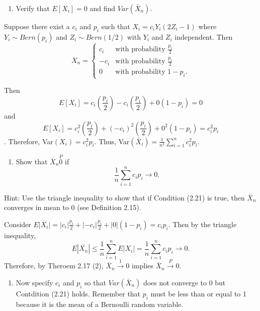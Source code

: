 \documentclass[12pt,]{article}
\providecommand{\tightlist}{%
  \setlength{\itemsep}{0pt}\setlength{\parskip}{0pt}}
\begin{document}
\begin{enumerate}
\def\labelenumi{(\alph{enumi})}
\tightlist
\item
  Verify that \(E[X_i] = 0\) and find \(Var(\bar{X}_n).\)
\end{enumerate}

Suppose there exist a \(c_i\) and \(p_i\) such that
\(X_i = c_iY_i(2Z_i-1)\) where \(Y_i\sim Bern(p_i)\) and
\(Z_i\sim Bern(1/2)\) with \(Y_i\) and \(Z_i\) independent. Then
\[X_n = \begin{cases}
                                   c_i & \text{with probability $\frac{p_i}{2}$} \\
                                   -c_i & \text{with probability $\frac{p_i}{2}$} \\
                                   0 & \text{with probability $1-p_i$}.
  \end{cases}\]

Then
\[E[X_i]=c_i\left(\frac{p_i}{2}\right)-c_i\left(\frac{p_i}{2}\right)+0(1-p_i)=0\]
and
\[E[X_i]=c_i^2\left(\frac{p_i}{2}\right)+(-c_i)^2\left(\frac{p_i}{2}\right)+0^2(1-p_i)=c_i^2p_i\].
Therefore, Var\((X_i) = c_i^2p_i.\) Thus,
Var\((\bar{X}_i)=\frac{1}{n^2}\sum_{i=1}^n c_i^2p_i\).

\begin{enumerate}
\def\labelenumi{(\alph{enumi})}
\setcounter{enumi}{1}
\tightlist
\item
  Show that \(\bar{X}_n \overset{P} 0\) if
  \[\frac{1}{n}\sum_{i=1}^n c_ip_i\rightarrow 0.\]
\end{enumerate}

Hint: Use the triangle inequality to show that if Condition (2.21) is
true, then \(\bar{X}_n\) converges in mean to 0 (see Definition 2.15).

Consider
\(E|X_i|=|c_i|\frac{p_i}{2}+|-c_i|\frac{p_i}{2}+|0|(1-p_i)=c_ip_i.\)
Then by the triangle inequality,
\[E|\bar{X_n}|\le \frac{1}{n}\sum_{i=1}^nE|X_i|=\frac{1}{n}\sum_{i=1}^nc_ip_i\rightarrow 0.\]
Therefore, by Theroem 2.17 (2), \(\bar{X}_n\overset{1}\rightarrow 0\)
implies \(\bar{X}_n\overset{P}\rightarrow 0.\)

\begin{enumerate}
\def\labelenumi{(\alph{enumi})}
\setcounter{enumi}{2}
\tightlist
\item
  Now specify \(c_i\) and \(p_i\) so that \(Var(\bar{X}_n)\) does not
  converge to 0 but Contdition (2.21) holds. Remember that \(p_i\) must
  be less than or equal to 1 because it is the mean of a Bernoulli
  random variable.
\end{enumerate}
\end{document}
